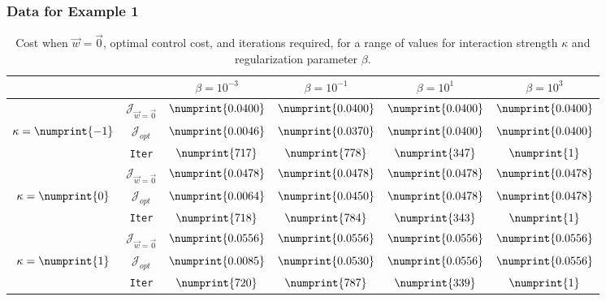 \documentclass[aspectratio=169,xcolor=dvipsnames]{beamer}
\begin{document}
\begin{frame}
	\frametitle{Data for Example 1}
	\begin{table}
		\centering
		\begin{tabular}{ | c | c || c | c | c | c ||}
			\hline
			\multicolumn{2}{|c||}{}& $\beta = 10^{-3}$ & $\beta = 10^{-1}$ & $\beta = 10^{1}$ & $\beta = 10^{3}$  \\
			\hline
			\hline
			& $\mathcal J_{\vec{w} = \vec 0}$ & $\numprint{0.0400}$ & $\numprint{0.0400}$ & $\numprint{0.0400}$ & $\numprint{0.0400}$ \\
			$\kappa= \numprint{-1}$  & $\mathcal{J}_{opt}$ & $\numprint{0.0046}$ & $\numprint{0.0370}$ & $\numprint{0.0400}$ & $\numprint{0.0400}$ \\
			& \texttt{Iter} & $\numprint{717}$ & $\numprint{778}$ & $\numprint{347}$ & $\numprint{1}$ \\
			\hline
			& $\mathcal J_{\vec{w} = \vec 0}$ & $\numprint{0.0478}$ & $\numprint{0.0478}$ & $\numprint{0.0478}$ & $\numprint{0.0478}$ \\
			$\kappa= \numprint{0}$  & $\mathcal{J}_{opt}$ & $\numprint{0.0064}$ & $\numprint{0.0450}$ & $\numprint{0.0478}$ & $\numprint{0.0478}$ \\
			& \texttt{Iter} & $\numprint{718}$ & $\numprint{784}$ & $\numprint{343}$ & $\numprint{1}$ \\
			\hline
			& $\mathcal J_{\vec{w} = \vec 0}$ & $\numprint{0.0556}$ & $\numprint{0.0556}$ & $\numprint{0.0556}$ & $\numprint{0.0556}$ \\
			$\kappa= \numprint{1}$  & $\mathcal{J}_{opt}$ & $\numprint{0.0085}$ & $\numprint{0.0530}$ & $\numprint{0.0556}$ & $\numprint{0.0556}$ \\
			& \texttt{Iter} & $\numprint{720}$ & $\numprint{787}$ & $\numprint{339}$ & $\numprint{1}$ \\
			\hline
		\end{tabular}
		\caption{Cost when $\vec{w}=\vec{0}$, optimal control cost, and iterations required, for a range of values for interaction strength $\kappa$ and regularization parameter $\beta$.}
		\label{TabS5:Prob22D}
	\end{table}
\end{frame}
\end{document}
